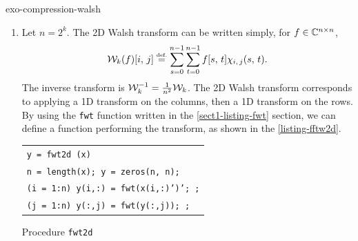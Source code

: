  
\begin{correction}{exo-compression-walsh}
\begin{enumerate}
\item Let $ n = 2^k $. The 2D Walsh transform can be written simply, for $ f \in \mathbb{C}^{n \times n} $,
\begin{equation*}
\mathcal{W}_k (f) [i, \, j] \stackrel{\mbox{\upshape\tiny def.}}{=} \sum_{s = 0}^{n-1}{\sum_{t = 0}^{n-1}{f [s, \, t] \chi_{i, \, j} (s, \, t)}}.
\end{equation*}
The inverse transform is $ \mathcal{W}_k^{-1} = \tfrac{1}{n^2} \mathcal{W}_k $. The 2D Walsh transform corresponds to applying a 1D transform on the columns, then a 1D transform on the rows. By using the \texttt{\upshape fwt} function written in the \ref{sect1-listing-fwt} section, we can define a \Matlab{} function performing the transform, as shown in the \listingterme{} \ref{listing-fftw2d}.
 
\begin{listing} \begin{footnotesize}
{\upshape
\begin{tabular}{l} \texttt{\pfunction y = fwt2d (x)} \\
\texttt{n = length(x); y = zeros(n, n);} \\
\texttt{\pfor{}(i = 1:n) y(i,:) = fwt(x(i,:)')'; \pend{};} \\
\texttt{\pfor{}(j = 1:n) y(:,j) = fwt(y(:,j)); \pend{};} \\
\end{tabular}
}
\end{footnotesize}
\caption{Procedure \texttt{\upshape fwt2d}}
\label{listing-fftw2d}
\end{listing}
 

\end{enumerate}
\end{correction}
